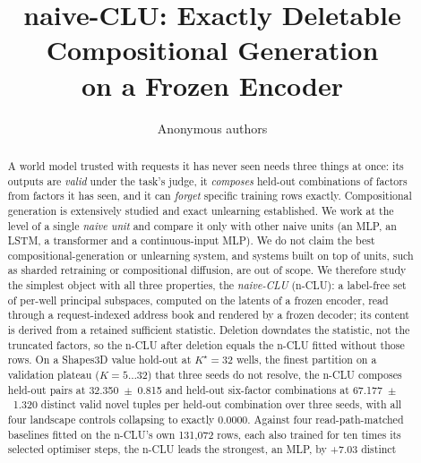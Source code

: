 \documentclass{article} %
\title{naive-CLU: Exactly Deletable Compositional Generation\\ on a Frozen Encoder}
\author{Anonymous authors}
\newcommand{\Kstar}{\ensuremath{K^{\star}}}
\begin{document}
\maketitle

\begin{abstract}
A world model trusted with requests it has never seen needs three things at once: its outputs are \emph{valid} under the task's judge, it \emph{composes}
held-out combinations of factors from factors it has seen, and it can \emph{forget} specific
training rows exactly. Compositional generation is extensively studied and exact unlearning established. We work at the level of a single \emph{naive unit} and
compare it only with other naive units (an MLP, an LSTM, a transformer and a continuous-input MLP).
We do not claim the best compositional-generation or unlearning system, and systems built on top of
units, such as sharded retraining or compositional diffusion, are out of scope.
We therefore study the simplest object with all three properties, the \emph{naive-CLU} (n-CLU): a
label-free set of per-well principal subspaces, computed on the latents of a frozen
encoder, read through a request-indexed address book and rendered by a frozen decoder; its
content is derived from a retained sufficient statistic. Deletion downdates the statistic, not the truncated factors, so the n-CLU after deletion equals the n-CLU fitted without those rows.
On a Shapes3D value hold-out at $\Kstar=32$ wells, the finest partition on a validation plateau
($K=5\ldots32$) that three seeds do not resolve, %
the n-CLU composes held-out pairs at 32.350~$\pm$~0.815 and held-out six-factor combinations at
67.177~$\pm$~1.320 distinct valid novel tuples per held-out combination over three seeds, with all four landscape
controls collapsing to exactly 0.0000. %
Against four read-path-matched baselines fitted on the n-CLU's own 131,072 rows, each also trained for
ten times its selected optimiser steps, the n-CLU leads the strongest, an MLP, by +7.03 distinct

\end{abstract}
\end{document}
